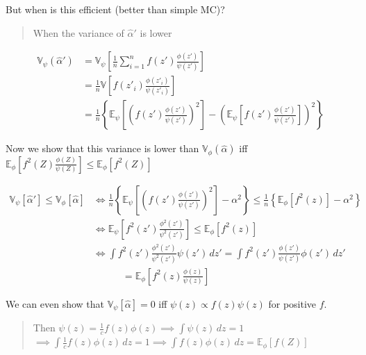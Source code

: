 \documentclass[
  oneside]{book}
\begin{document}
But when is this efficient (better than simple MC)?

\begin{quote}
When the variance of \(\hat{\alpha}'\) is lower
\end{quote}

\[
\begin{aligned}
\mathbb{V}_{\psi}(\hat{\alpha}') &= \mathbb{V}_{\psi} \left[ \frac{1}{n} \sum^{n}_{i=1}  f(z') \frac{\phi(z')}{\psi(z')} \right] \\
&= \frac{1}{n} \mathbb{V} \left[ f(z'_{i}) \frac{\phi(z'_{i})}{\psi(z'_{i})} \right] \\
&= \frac{1}{n} \left\{ \mathbb{E}_{\psi} \left[ \left( f(z') \frac{\phi(z')}{\psi(z')} \right)^{2} \right] - \left( \mathbb{E}_{\psi} \left[ f(z') \frac{\phi(z')}{\psi(z')} \right]  \right)^{2} \right\}
\end{aligned}
\]

Now we show that this variance is lower than \(\mathbb{V}_{\phi}(\hat{\alpha})\) iff \(\mathbb{E}_{\phi} \left[ f^{2}(Z) \frac{\phi(Z)}{\psi(Z)} \right] \leq \mathbb{E}_{\phi}\left[ f^{2}(Z) \right]\)

\[
\begin{aligned}
\mathbb{V}_{\psi}\left[ \hat{\alpha}' \right] \leq \mathbb{V}_{\phi}[\hat{\alpha}] &\iff \frac{1}{n} \left\{ \mathbb{E}_{\psi}\left[ \left( f(z') \frac{\phi(z')}{\psi(z')} \right)^{2} \right] - \alpha^{2} \right\} \leq \frac{1}{n} \left\{ \mathbb{E}_{\phi} \left[ f^{2}(z) \right] -\alpha^{2} \right\} \\
&\iff \mathbb{E}_{\psi}\left[ f^{2}(z') \frac{\phi^{2}(z')}{\psi^{2}(z')} \right] \leq \mathbb{E}_{\phi} \left[ f^{2}(z) \right]\\
&\iff \int  f^{2}(z') \frac{\phi^{2}(z')}{\psi^{2}(z')} \psi(z') \, dz' = \int f^{2}(z') \frac{\phi(z')}{\psi(z')} \phi(z') \, dz'\\
&\quad \quad \quad = \mathbb{E}_{\phi}\left[ f^{2}(z) \frac{\phi(z)}{\psi(z)} \right] 
\end{aligned}
\]

We can even show that \(\mathbb{V}_{\psi}[\hat{\alpha}] = 0\) iff \(\psi(z) \propto f(z)\psi(z)\) for positive \(f\).

\begin{quote}
Then \(\psi(z) = \frac{1}{c} f(z)\phi(z) \implies \int \psi(z) \, dz = 1\)
\(\implies \int \frac{1}{c} f(z)\phi(z) \, dz = 1 \implies \int f(z)\phi(z) \, dz = \mathbb{E}_{\phi}[f(Z)]\)
\end{quote}
\end{document}
